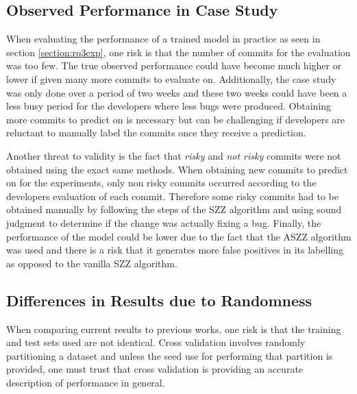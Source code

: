 \documentclass[../main.tex]{subfiles}
\begin{document}
\subsection{Observed Performance in Case Study}

When evaluating the performance of a trained model in practice as seen in section \ref{section:rq3exp}, one risk is that the number of commits for the evaluation was too few. The true observed performance could have become much higher or lower if given many more commits to evaluate on. Additionally, the case study was only done over a period of two weeks and these two weeks could have been a less busy period for the developers where less bugs were produced. Obtaining more commits to predict on is necessary but can be challenging if developers are reluctant to manually label the commits once they receive a prediction. 

Another threat to validity is the fact that \textit{risky} and \textit{not risky} commits were not obtained using the exact same methods. When obtaining new commits to predict on for the experiments, only non risky commits occurred according to the developers evaluation of each commit. Therefore some risky commits had to be obtained manually by following the steps of the SZZ algorithm and using sound judgment to determine if the change was actually fixing a bug. Finally, the performance of the model could be lower due to the fact that the ASZZ algorithm was used and there is a risk that it generates more false positives in its labelling as opposed to the vanilla SZZ algorithm.

\subsection{Differences in Results due to Randomness}

When comparing current results to previous works, one risk is that the training and test sets used are not identical. Cross validation involves randomly partitioning a dataset and unless the seed use for performing that partition is provided, one must trust that cross validation is providing an accurate description of performance in general. 
\end{document}

